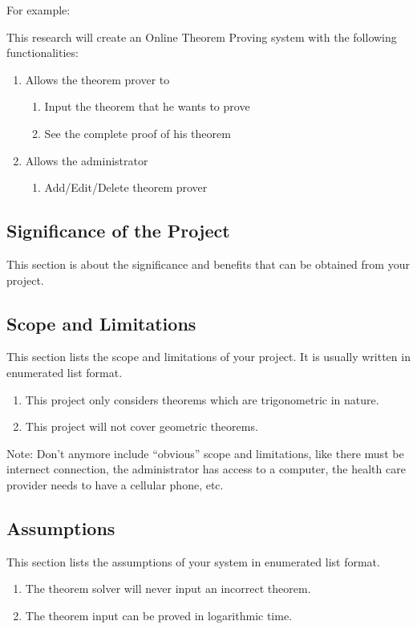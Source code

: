 \documentclass[11pt,a4paper,titlepage]{article}
\begin{document}
For example:

This research will create an Online Theorem Proving system with the following functionalities:

\begin{enumerate}
	\item Allows the theorem prover to
	\begin{enumerate}
		\item Input the theorem that he wants to prove
		\item See the complete proof of his theorem
	\end{enumerate}
	
	\item Allows the administrator
	\begin{enumerate}
		\item Add/Edit/Delete theorem prover
	\end{enumerate}
\end{enumerate}

\subsection{Significance of the Project}
This section is about the significance and benefits that can be obtained from your project.

\subsection{Scope and Limitations}
This section lists the scope and limitations of your project. It is usually written in enumerated list format.
\begin{enumerate}
	\item This project only considers theorems which are trigonometric in nature.
	\item This project will not cover geometric theorems.
\end{enumerate}

Note: Don't anymore include ``obvious'' scope and limitations, like there must be internect connection, the administrator
has access to a computer, the health care provider needs to have a cellular phone, etc.

\subsection{Assumptions}
This section lists the assumptions of your system in enumerated list format.
\begin{enumerate}
	\item The theorem solver will never input an incorrect theorem.
	\item The theorem input can be proved in logarithmic time.
\end{enumerate}
\end{document}
